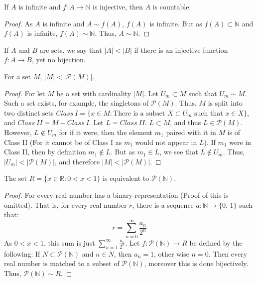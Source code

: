         \begin{theorem}
            If $A$ is infinite and $f:A\rightarrow\mathbb{N}$ is injective,
            then $A$ is countable.
        \end{theorem}
        \begin{proof}
        As $A$ is infinite and $A\sim f(A)$, $f(A)$ is infinite.
        But as $f(A)\subset \mathbb{N}$ and $f(A)$ is infinite,
        $f(A)\sim \mathbb{N}$. Thus, $A\sim \mathbb{N}$.
        \end{proof}
        \begin{definition}
            If $A$ and $B$ are sets, we say that $|A|<|B|$ if there is an
            injective function $f:A\rightarrow B$, yet no bijection.
        \end{definition}
        \begin{theorem}
            For a set $M$, $|M|<|\mathcal{P}(M)|$.
        \end{theorem}
        \begin{proof}
        For let $M$ be a set with cardinality $|M|$. Let $U_m \subset M$ such that $U_m \sim M$.
        Such a set exists, for example, the singletons of $\mathcal{P}(M)$. Thus, $M$ is split into
        two distinct sets $Class\ I=\{x\in M: \textrm{There is a subset } X\subset U_m\textrm{ such that }x\in X\}$,
        and $Class\ II=M-Class\ I$. Let $L = Class\ II$. $L\subset M$, and thus $L\in \mathcal{P}(M)$. However,
        $L \notin U_m$ for if it were, then the element $m_1$ paired with it in $M$ is of Class II
        (For it cannot be of Class I as $m_1$ would not appear in $L$). If $m_1$ were in Class II,
        then by definition $m_1 \notin L$. But as $m_1 \in L$, we see that $L\notin U_m$. Thus,
        $|U_m| <|\mathcal{P}(M)|$, and therefore $|M|<|\mathcal{P}(M)|$.
        \end{proof}
        \begin{theorem}
            The set $R=\{x\in \mathbb{R}:0<x<1\}$ is equivalent to
            $\mathcal{P}(\mathbb{N})$.
        \end{theorem}
        \begin{proof}
            For every real number has a binary representation (Proof of this
            is omitted). That is, for every real number $r$, there is a sequence
            $a:\mathbb{N}\rightarrow\{0,\,1\}$ such that:
            \begin{equation}
                r=\sum_{n=0}^{\infty}\frac{a_{n}}{2^{n}}
            \end{equation}
        As $0<x<1$, this sum is just $\sum_{n=1}^{\infty} \frac{a_n}{2^n}$.
        Let $f:\mathcal{P}(\mathbb{N})\rightarrow R$ be defined by the
        following: If $N\subset \mathcal{P}(\mathbb{N})$ and $n\in N$, then
        $a_{n}=1$, other wise $n=0$. Then every real number is matched to a
        subset of $\mathcal{P}(\mathbb{N})$, moreover this is done bijectively.
        Thus, $\mathcal{P}(\mathbb{N})\sim R$.
        \end{proof}
